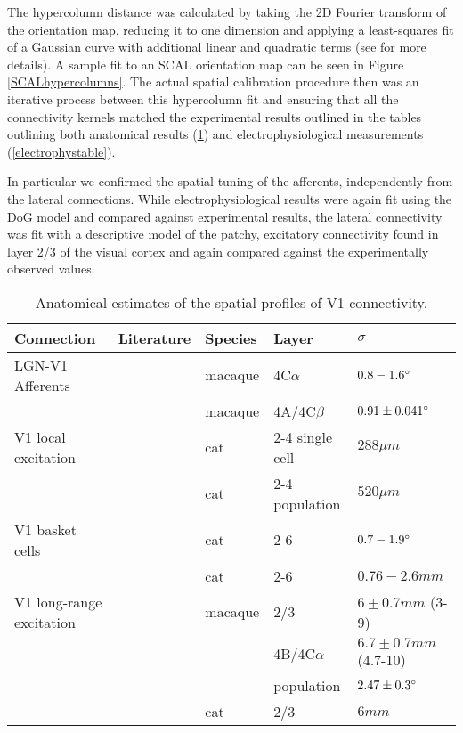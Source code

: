 The hypercolumn distance was calculated by taking the 2D Fourier
transform of the orientation map, reducing it to one dimension and
applying a least-squares fit of a Gaussian curve with additional
linear and quadratic terms (see \cite{Kaschube2010} for more
details). A sample fit to an SCAL orientation map can be seen in
Figure \ref{SCALhypercolumns}. The actual spatial calibration
procedure then was an iterative process between this hypercolumn fit
and ensuring that all the connectivity kernels matched the
experimental results outlined in the tables outlining both anatomical
results (\ref{anatomicaltable}) and electrophysiological measurements
(\ref{electrophystable}).

In particular we confirmed the spatial tuning of the afferents,
independently from the lateral connections. While electrophysiological
results were again fit using the DoG model and compared against
experimental results, the lateral connectivity was fit with a
descriptive model of the patchy, excitatory connectivity found in
layer 2/3 of the visual cortex and again compared against the
experimentally observed values.

\begin{table}
  \centering
  \begin{adjustbox}{width=1\textwidth}
  \begin{tabular}{l | l l l l}
    Connection               & Literature            & Species & Layer & $\sigma$ \\
    \hline
    LGN-V1 Afferents         & \cite{Angelucci2002c} & macaque & 4C$\alpha$ & $0.8-1.6\degree$ \\ 
                             & \cite{Angelucci2006a} & macaque & 4A/4C$\beta$ & $0.91 \pm 0.041 \degree$ \\
    \hline
    V1 local excitation      & \cite{Buzas2006}      & cat      & 2-4 single cell & $288 \mu m$ \\
                             & \cite{Buzas2006}      & cat      & 2-4 population  & $520 \mu m$ \\
    \hline
    V1 basket cells          & \cite{Buzas2001}      & cat      & 2-6 & $0.7-1.9 \degree$ \\
                             & \cite{Buzas2001}      & cat      & 2-6 & $0.76-2.6 mm$ \\
    \hline
    V1 long-range excitation & \cite{Angelucci2002}  & macaque  & 2/3 & $6\pm 0.7 mm$ (3-9) \\
                             &                       &          & 4B/4C$\alpha$ & $6.7 \pm 0.7 mm$ (4.7-10) \\
                             &                       &          & population & $2.47 \pm 0.3 \degree$ \\
                             & \cite{Buzas2006}      & cat      & 2/3 & $6 mm$ \\
    \hline
  \end{tabular}
  \end{adjustbox}
  \caption[]%
          {Anatomical estimates of the spatial profiles of V1 connectivity.}
  \label{anatomicaltable}
\end{table}

